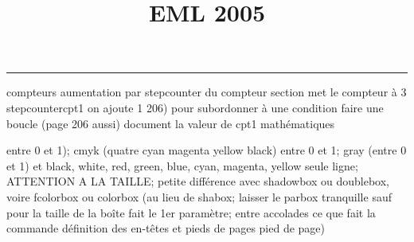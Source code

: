 \documentclass[11pt]{article}%
\title{\bf \vspace{-2cm} EML 2005} %
\author{} %
\date{} %
\renewcommand{\headrulewidth}{0pt}%
\renewcommand{\footrulewidth}{0.4pt}%
\begin{document}
\maketitle %
\vspace{-1.4cm}\hrule %
\thispagestyle{fancy}

\vspace*{.2cm}



compteurs%
aumentation par stepcounter du compteur section%
met le compteur à 3%
stepcounter{cpt1} on ajoute 1%
206) pour subordonner à une condition %
faire une boucle (page 206 aussi) %
document la valeur de cpt1 
mathématiques\newcommand{\ch}{\operatorname{ch}} 
\newcommand{\sh}{\operatorname{sh}}
\renewcommand{\tanh}{\operatorname{th}}
\renewcommand{\sinh}{\operatorname{sh}}
\renewcommand{\cosh}{\operatorname{ch}}
\newcommand{\argsh}{\operatorname{argsh}}
\newcommand{\argch}{\operatorname{argch}}
\newcommand{\argth}{\operatorname{argth}}
\newcommand{\ker}{\operatorname{Ker}}
\renewcommand{\im}{\operatorname{Im}}
\newcommand{\rg}{\operatorname{rg}}
\newcommand{\Id}{\operatorname{Id}}
\newcommand{\id}{\operatorname{id}}
\renewcommand{\leq}{\leq}
\renewcommand{\geq}{\geq }

entre 0 et 1); cmyk (quatre cyan magenta yellow black) entre 0 et 1;
gray (entre 0 et 1) et black, white, red, green, blue, cyan, magenta,
yellow%
seule ligne; ATTENTION A LA TAILLE; petite différence avec shadowbox ou
doublebox, voire fcolorbox ou colorbox (au lieu de shabox; laisser le
parbox tranquille sauf pour la taille de la boîte
\newcommand{\Tbox}[1]{\begin{center} \shabox{\parbox{0.6
\linewidth}{#1}} \end{center}} %
fait le 1er paramètre; entre accolades ce que fait la commande
définition des en-têtes et pieds de pages\pagestyle{fancy}
\chead{}
\rfoot[ \ \thepage]{\thepage}
\cfoot{}
\lfoot{}
\thispagestyle{fancy} %
pied de page)\renewcommand{\footrulewidth}{0.4pt}
\renewcommand{\headrulewidth}{0.4pt}
\end{document}
